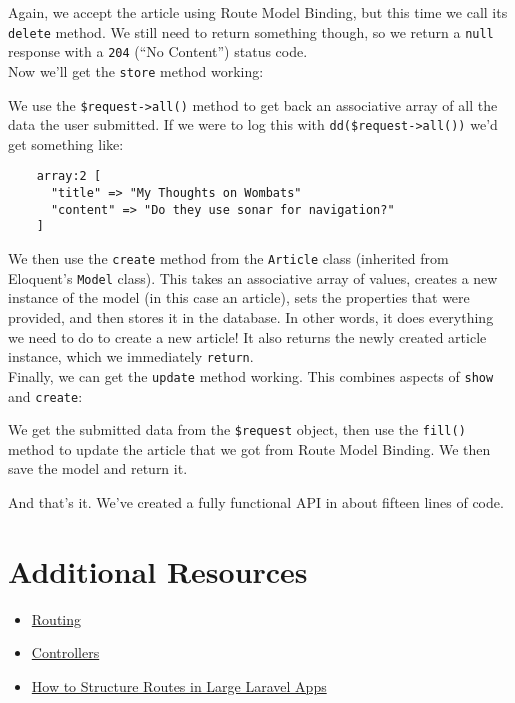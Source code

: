 Again, we accept the article using Route Model Binding, but this time we call its \texttt{delete} method. We still need to return something though, so we return a \texttt{null} response with a \texttt{204} (``No Content'') status code.
\\

Now we'll get the \texttt{store} method working:


We use the \texttt{\$request->all()} method to get back an associative array of all the data the user submitted. If we were to log this with \texttt{dd(\$request->all())} we'd get something like:

\begin{verbatim}
    array:2 [
      "title" => "My Thoughts on Wombats"
      "content" => "Do they use sonar for navigation?"
    ]
\end{verbatim}

We then use the \texttt{create} method from the \texttt{Article} class (inherited from Eloquent's \texttt{Model} class). This takes an associative array of values, creates a new instance of the model (in this case an article), sets the properties that were provided, and then stores it in the database. In other words, it does everything we need to do to create a new article! It also returns the newly created article instance, which we immediately \texttt{return}.
\\

Finally, we can get the \texttt{update} method working. This combines aspects of \texttt{show} and \texttt{create}:


We get the submitted data from the \texttt{\$request} object, then use the \texttt{fill()} method to update the article that we got from Route Model Binding. We then save the model and return it.

\hr

And that's it. We've created a fully functional API in about fifteen lines of code.


\section{Additional Resources}

\begin{itemize}[leftmargin=*]
    \item \href{https://laravel.com/docs/master/routing}{Routing}
    \item \href{http://laravel.com/docs/master/controllers}{Controllers}
    \item \href{https://laraveldaily.com/how-to-structure-routes-in-large-laravel-projects/}{How to Structure Routes in Large Laravel Apps}
\end{itemize}
